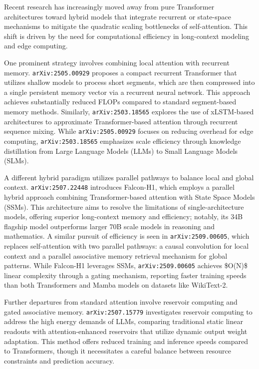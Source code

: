 \documentclass[11pt]{article}
\begin{document}
Recent research has increasingly moved away from pure Transformer architectures toward hybrid models that integrate recurrent or state-space mechanisms to mitigate the quadratic scaling bottlenecks of self-attention. This shift is driven by the need for computational efficiency in long-context modeling and edge computing.

One prominent strategy involves combining local attention with recurrent memory. \texttt{arXiv:2505.00929} proposes a compact recurrent Transformer that utilizes shallow models to process short segments, which are then compressed into a single persistent memory vector via a recurrent neural network. This approach achieves substantially reduced FLOPs compared to standard segment-based memory methods. Similarly, \texttt{arXiv:2503.18565} explores the use of xLSTM-based architectures to approximate Transformer-based attention through recurrent sequence mixing. While \texttt{arXiv:2505.00929} focuses on reducing overhead for edge computing, \texttt{arXiv:2503.18565} emphasizes scale efficiency through knowledge distillation from Large Language Models (LLMs) to Small Language Models (SLMs).

A different hybrid paradigm utilizes parallel pathways to balance local and global context. \texttt{arXiv:2507.22448} introduces Falcon-H1, which employs a parallel hybrid approach combining Transformer-based attention with State Space Models (SSMs). This architecture aims to resolve the limitations of single-architecture models, offering superior long-context memory and efficiency; notably, its 34B flagship model outperforms larger 70B scale models in reasoning and mathematics. A similar pursuit of efficiency is seen in \texttt{arXiv:2509.00605}, which replaces self-attention with two parallel pathways: a causal convolution for local context and a parallel associative memory retrieval mechanism for global patterns. While Falcon-H1 leverages SSMs, \texttt{arXiv:2509.00605} achieves \$O(N)\$ linear complexity through a gating mechanism, reporting faster training speeds than both Transformers and Mamba models on datasets like WikiText-2.

Further departures from standard attention involve reservoir computing and gated associative memory. \texttt{arXiv:2507.15779} investigates reservoir computing to address the high energy demands of LLMs, comparing traditional static linear readouts with attention-enhanced reservoirs that utilize dynamic output weight adaptation. This method offers reduced training and inference speeds compared to Transformers, though it necessitates a careful balance between resource constraints and prediction accuracy.
\end{document}
